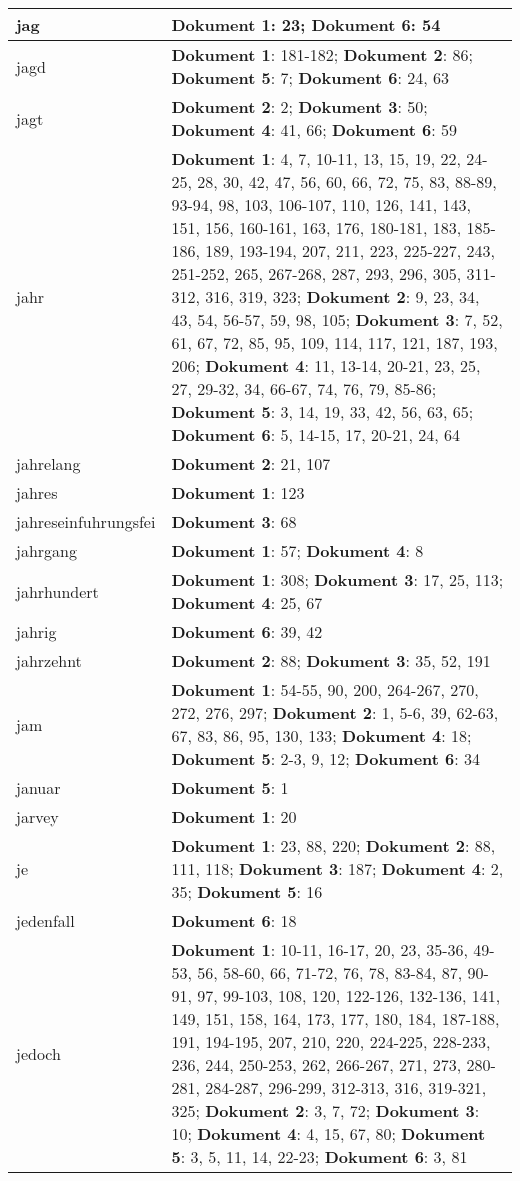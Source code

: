 \documentclass[a5paper]{article}
\begin{document}
\begin{longtable}[l]{|l|p{3in}|}
\hline
jag & \textbf{Dokument 1}: 23; \textbf{Dokument 6}: 54 \\
\hline
jagd & \textbf{Dokument 1}: 181-182; \textbf{Dokument 2}: 86; \textbf{Dokument 5}: 7; \textbf{Dokument 6}: 24, 63 \\
\hline
jagt & \textbf{Dokument 2}: 2; \textbf{Dokument 3}: 50; \textbf{Dokument 4}: 41, 66; \textbf{Dokument 6}: 59 \\
\hline
jahr & \textbf{Dokument 1}: 4, 7, 10-11, 13, 15, 19, 22, 24-25, 28, 30, 42, 47, 56, 60, 66, 72, 75, 83, 88-89, 93-94, 98, 103, 106-107, 110, 126, 141, 143, 151, 156, 160-161, 163, 176, 180-181, 183, 185-186, 189, 193-194, 207, 211, 223, 225-227, 243, 251-252, 265, 267-268, 287, 293, 296, 305, 311-312, 316, 319, 323; \textbf{Dokument 2}: 9, 23, 34, 43, 54, 56-57, 59, 98, 105; \textbf{Dokument 3}: 7, 52, 61, 67, 72, 85, 95, 109, 114, 117, 121, 187, 193, 206; \textbf{Dokument 4}: 11, 13-14, 20-21, 23, 25, 27, 29-32, 34, 66-67, 74, 76, 79, 85-86; \textbf{Dokument 5}: 3, 14, 19, 33, 42, 56, 63, 65; \textbf{Dokument 6}: 5, 14-15, 17, 20-21, 24, 64 \\
\hline
jahrelang & \textbf{Dokument 2}: 21, 107 \\
\hline
jahres & \textbf{Dokument 1}: 123 \\
\hline
jahreseinfuhrungsfei & \textbf{Dokument 3}: 68 \\
\hline
jahrgang & \textbf{Dokument 1}: 57; \textbf{Dokument 4}: 8 \\
\hline
jahrhundert & \textbf{Dokument 1}: 308; \textbf{Dokument 3}: 17, 25, 113; \textbf{Dokument 4}: 25, 67 \\
\hline
jahrig & \textbf{Dokument 6}: 39, 42 \\
\hline
jahrzehnt & \textbf{Dokument 2}: 88; \textbf{Dokument 3}: 35, 52, 191 \\
\hline
jam & \textbf{Dokument 1}: 54-55, 90, 200, 264-267, 270, 272, 276, 297; \textbf{Dokument 2}: 1, 5-6, 39, 62-63, 67, 83, 86, 95, 130, 133; \textbf{Dokument 4}: 18; \textbf{Dokument 5}: 2-3, 9, 12; \textbf{Dokument 6}: 34 \\
\hline
januar & \textbf{Dokument 5}: 1 \\
\hline
jarvey & \textbf{Dokument 1}: 20 \\
\hline
je & \textbf{Dokument 1}: 23, 88, 220; \textbf{Dokument 2}: 88, 111, 118; \textbf{Dokument 3}: 187; \textbf{Dokument 4}: 2, 35; \textbf{Dokument 5}: 16 \\
\hline
jedenfall & \textbf{Dokument 6}: 18 \\
\hline
jedoch & \textbf{Dokument 1}: 10-11, 16-17, 20, 23, 35-36, 49-53, 56, 58-60, 66, 71-72, 76, 78, 83-84, 87, 90-91, 97, 99-103, 108, 120, 122-126, 132-136, 141, 149, 151, 158, 164, 173, 177, 180, 184, 187-188, 191, 194-195, 207, 210, 220, 224-225, 228-233, 236, 244, 250-253, 262, 266-267, 271, 273, 280-281, 284-287, 296-299, 312-313, 316, 319-321, 325; \textbf{Dokument 2}: 3, 7, 72; \textbf{Dokument 3}: 10; \textbf{Dokument 4}: 4, 15, 67, 80; \textbf{Dokument 5}: 3, 5, 11, 14, 22-23; \textbf{Dokument 6}: 3, 81 \\

\end{longtable}
\end{document}

